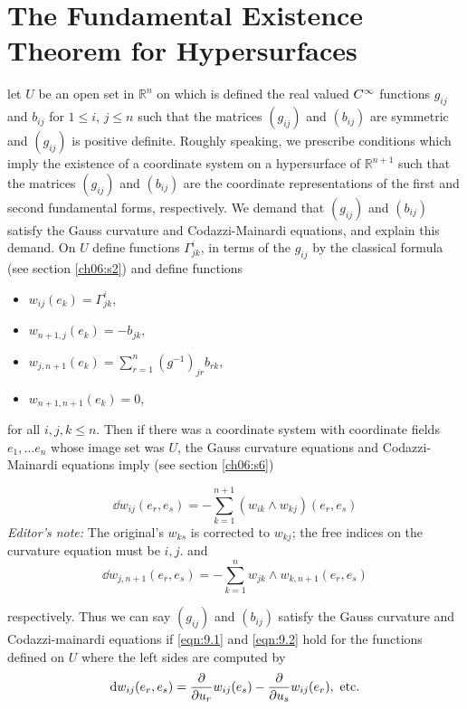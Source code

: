 \documentclass[../main]{subfiles}
\begin{document}
\section{The Fundamental Existence Theorem for Hypersurfaces}\label{ch09:s2}

let $U$ be an open set in $\mathbb{R}^n$ on which is defined the real valued $C^\infty$ functions $g_{ij}$ and $b_{ij}$ for $1 \leq i$,  $j \leq n$ such that the matrices $(g_{ij})$ and $(b_{ij})$ are symmetric and $(g_{ij})$ is positive definite. Roughly speaking, we prescribe conditions which imply the existence of a coordinate system on a hypersurface of $\mathbb{R}^{n+1}$ such that the matrices $(g_{ij})$ and $(b_{ij})$ are the coordinate representations of the first and second fundamental forms, respectively. We demand that $(g_{ij})$ and $(b_{ij})$ satisfy the Gauss curvature and Codazzi-Mainardi equations, and explain this demand. On $U$ define functions $\Gamma^i_{jk}$, in terms of the $g_{ij}$ by the classical formula (see section \ref{ch06:s2}) and define functions
\begin{itemize}
    \item $w_{ij}(e_k) = \Gamma^i_{jk},$
    \item $w_{n+1,j}(e_k) = -b_{jk},$
    \item $w_{j,n+1}(e_k) = \displaystyle \sum_{r=1}^n (g^{-1})_{jr}b_{rk},$
    \item $w_{n+1,n+1}(e_k) = 0$,
\end{itemize}
 for all $i, j, k \leq n$. Then if there was a coordinate system with coordinate fields $e_1 , \dots e_n$ whose image set was $U$, the Gauss curvature equations and Codazzi-Mainardi equations imply (see section \ref{ch06:s6})

\begin{equation}\tag{1}\label{eqn:9.1}
     \dd{w}_{ij}(e_r, e_s) = -\sum_{k = 1}^{n+1}(w_{ik} \wedge w_{kj})(e_r, e_s)
\end{equation}
\emph{Editor's note:} The original's $w_{ks}$ is corrected to $w_{kj}$; the free indices on the curvature equation must be $i,j$.
and
\begin{equation}\tag{2}\label{eqn:9.2}
      \dd{w}_{j,n+1}(e_r, e_s) = -\sum_{k = 1}^{n}w_{jk} \wedge w_{k,n+1}(e_r, e_s)
 \end{equation}

respectively. Thus we can say $(g_{ij})$ and $(b_{ij})$ satisfy the Gauss curvature and Codazzi-mainardi equations if \ref{eqn:9.1} and \ref{eqn:9.2} hold for the functions defined on $U$ where the left sides are computed by \[\mathrm{d}w_{ij}(e_r, e_s) = \dfrac{\partial }{\partial u_r}w_{ij}(e_s) - \dfrac{\partial }{\partial u_s}w_{ij}(e_r),\text{ etc.}\]
\end{document}
